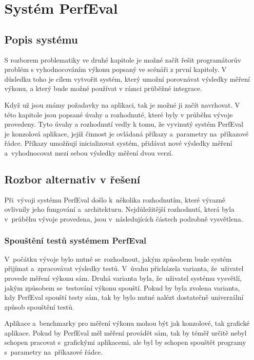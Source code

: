 \chapter{Systém PerfEval}

\section{Popis systému}

S rozborem problematiky ve druhé kapitole je možné začít řešit programátorův
problém s vyhodnocováním výkonu popsaný ve scénáři z první kapitoly.
V důsledku toho je cílem vytvořit systém, který umožní porovnávat výsledky
měření výkonu, a který bude možné používat v rámci průběžné integrace.

Když už jsou známy požadavky na aplikaci, tak je možné ji začít navrhovat.
V této kapitole jsou popsané úvahy a rozhodnuté, které byly v průběhu vývoje
provedeny. Tyto úvahy a rozhodnutí vedly k tomu, že vyvinutý systém PerfEval je konzolová aplikace,
jejíž činnost je ovládaná příkazy a~parametry na~příkazové řádce.
Příkazy umožňují inicializovat systém, přidávat nové výsledky měření a~vyhodnocovat mezi sebou výsledky
měření dvou verzí.

\section{Rozbor alternativ v řešení}
Při~vývoji systému PerfEval došlo k~několika rozhodnutím, které výrazně ovlivnily jeho fungování a~architekturu.
Nejdůležitější rozhodnutí, která byla v~průběhu vývoje provedena, jsou v~následujících částech podrobně vysvětlena.

\subsection{Spouštění testů systémem PerfEval}
V~počátku vývoje bylo nutné se~rozhodnout, jakým způsobem bude systém přijímat a~zpracovávat výsledky testů.
V~úvahu přicházela varianta, že~uživatel provede měření výkonu sám. Druhá varianta byla, že~uživatel systému
vysvětlí, jakým způsobem se~testování výkonu spouští. Pokud by byla zvolena varianta, kdy PerfEval spouští testy
sám, tak by bylo nutné nalézt dostatečně univerzální způsob spouštění testů.

Aplikace a~benchmarky pro měření výkonu mohou být jak konzolové, tak grafické aplikace. Pokud by PerfEval měl
měření provádět sám, tak by téměř určitě nebyl schopen pracovat s~grafickými aplikacemi, ale byl by schopen
spouštět programy s~parametry na~příkazové řádce.

